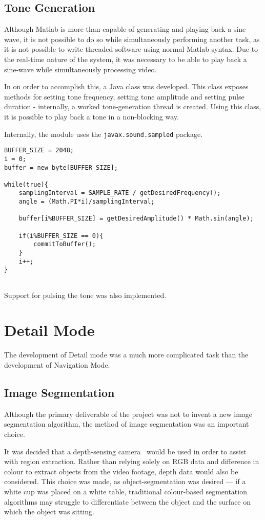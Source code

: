 \subsection{Tone Generation}
Although Matlab is more than capable of generating and playing back a sine wave, it is not possible to do so while simultaneously performing another task, as it is not possible to write threaded software using normal Matlab syntax. Due to the real-time nature of the system, it was necessary to be able to play back a sine-wave while simultaneously processing video.

In on order to accomplish this, a Java class was developed. This class exposes methods for setting tone frequency, setting tone amplitude and setting pulse duration - internally, a worked tone-generation thread is created. Using this class, it is possible to play back a tone in a non-blocking way. 

Internally, the module uses the \texttt{javax.sound.sampled} package. 

\begin{verbatim}
BUFFER_SIZE = 2048;
i = 0;
buffer = new byte[BUFFER_SIZE];

while(true){
    samplingInterval = SAMPLE_RATE / getDesiredFrequency();
    angle = (Math.PI*i)/samplingInterval;

    buffer[i%BUFFER_SIZE] = getDesiredAmplitude() * Math.sin(angle);

    if(i%BUFFER_SIZE == 0){
        commitToBuffer();
    }
    i++;
}
    
\end{verbatim}

Support for pulsing the tone was also implemented. 

\section{Detail Mode}
The development of Detail mode was a much more complicated task than the development of Navigation Mode.

\subsection{Image Segmentation}
Although the primary deliverable of the project was not to invent a new image segmentation algorithm, the method of image segmentation was an important choice.

It was decided that a depth-sensing camera~\cite{xtion} would be used in order to assist with region extraction. Rather than relying solely on RGB data and difference in colour to extract objects from the video footage, depth data would also be considered. This choice was made, as object-segmentation was desired --- if a white cup was placed on a white table, traditional colour-based segmentation algorithms may struggle to differentiate between the object and the surface on which the object was sitting.

